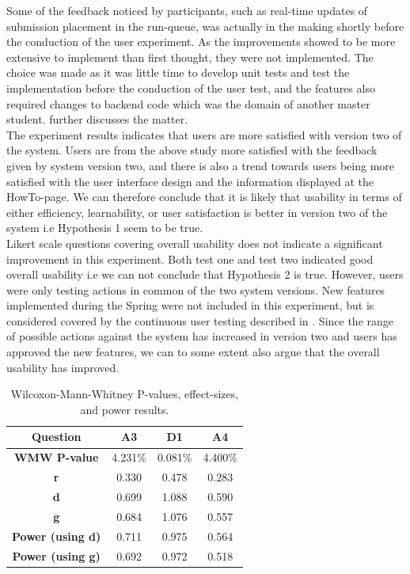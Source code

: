 Some of the feedback noticed by participants, such as real-time updates of submission placement in the run-queue, was actually in the making shortly before the conduction of the user experiment. As the improvements showed to be more extensive to implement than first thought, they were not implemented. The choice was made as it was little time to develop unit tests and test the implementation before the conduction of the user test, and the features also required changes to backend code which was the domain of another master student.  further discusses the matter. \\

The experiment results indicates that users are more satisfied with version two of the system. Users are from the above study more satisfied with the feedback given by system version two, and there is also a trend towards users being more satisfied with the user interface design and the information displayed at the HowTo-page. We can therefore conclude that it is likely that usability in terms of either efficiency, learnability, or user satisfaction is better in version two of the system i.e Hypothesis 1 seem to be true. \\

Likert scale questions covering overall usability does not indicate a significant improvement in this experiment. Both test one and test two indicated good overall usability i.e we can not conclude that Hypothesis 2 is true. However, users were only testing actions in common of the two system versions. New features implemented during the Spring were not included in this experiment, but is considered covered by the continuous user testing described in . Since the range of possible actions against the system has increased in version two and users has approved the new features, we can to some extent also argue that the overall usability has improved.

\begin{table}[t!]
    \centering
    \begin{tabular}{|c||c||c||c||}
      \hline
      \textbf{Question} & \textbf{A3} & \textbf{D1} & \textbf{A4} \\\hline
      \textbf{WMW P-value} & 4.231\% & 0.081\% & 4.400\%  \\ \hline
      \textbf{r} & 0.330 & 0.478 & 0.283\\ \hline
      \textbf{d} & 0.699 & 1.088 & 0.590 \\ \hline
      \textbf{g} & 0.684 & 1.076 & 0.557\\ \hline
      \textbf{Power (using d)} & 0.711 & 0.975 & 0.564 \\ \hline
      \textbf{Power (using g)} & 0.692 & 0.972 & 0.518 \\ \hline
    \end{tabular}
    \caption{Wilcoxon-Mann-Whitney P-values, effect-sizes, and power results.}
    \label{tab:significant-results}
\end{table}

